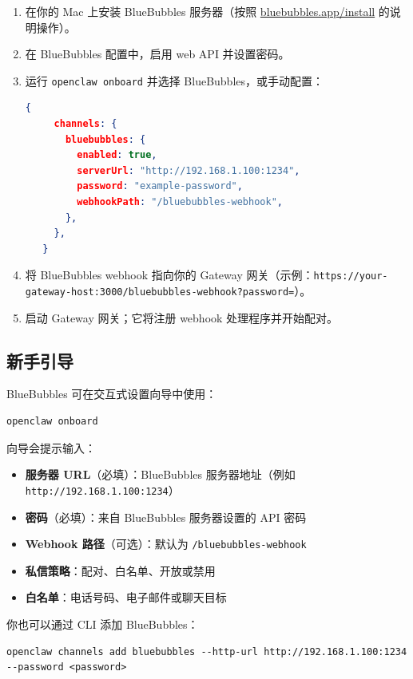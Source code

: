 \begin{enumerate}
  \item 在你的 Mac 上安装 BlueBubbles 服务器（按照 \href{https://bluebubbles.app/install}{bluebubbles.app/install} 的说明操作）。
  \item 在 BlueBubbles 配置中，启用 web API 并设置密码。
  \item 运行 \texttt{openclaw onboard} 并选择 BlueBubbles，或手动配置：
\begin{lstlisting}[language=json]
   {
     channels: {
       bluebubbles: {
         enabled: true,
         serverUrl: "http://192.168.1.100:1234",
         password: "example-password",
         webhookPath: "/bluebubbles-webhook",
       },
     },
   }
\end{lstlisting}

  \item 将 BlueBubbles webhook 指向你的 Gateway 网关（示例：\texttt{https://your-gateway-host:3000/bluebubbles-webhook?password=}）。
  \item 启动 Gateway 网关；它将注册 webhook 处理程序并开始配对。
\end{enumerate}


\subsection{新手引导}


BlueBubbles 可在交互式设置向导中使用：

\begin{lstlisting}
openclaw onboard
\end{lstlisting}


向导会提示输入：

\begin{itemize}
  \item \textbf{服务器 URL}（必填）：BlueBubbles 服务器地址（例如 \texttt{http://192.168.1.100:1234}）
  \item \textbf{密码}（必填）：来自 BlueBubbles 服务器设置的 API 密码
  \item \textbf{Webhook 路径}（可选）：默认为 \texttt{/bluebubbles-webhook}
  \item \textbf{私信策略}：配对、白名单、开放或禁用
  \item \textbf{白名单}：电话号码、电子邮件或聊天目标
\end{itemize}


你也可以通过 CLI 添加 BlueBubbles：

\begin{lstlisting}
openclaw channels add bluebubbles --http-url http://192.168.1.100:1234 --password <password>
\end{lstlisting}


